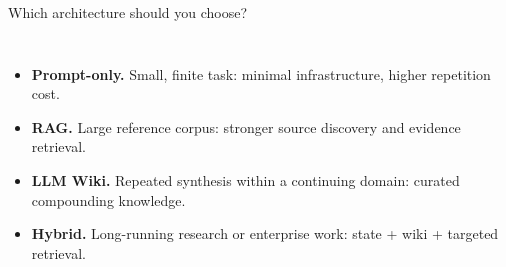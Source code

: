 \begin{frame}{Which architecture should you choose?}
\begin{columns}[c,onlytextwidth]
\begin{itemize}\setlength{\itemsep}{.48em}\small
\item \textbf{Prompt-only.} Small, finite task: minimal infrastructure, higher repetition cost.
\item \textbf{RAG.} Large reference corpus: stronger source discovery and evidence retrieval.
\item \textbf{LLM Wiki.} Repeated synthesis within a continuing domain: curated compounding knowledge.
\item \textbf{Hybrid.} Long-running research or enterprise work: state + wiki + targeted retrieval.
\end{itemize}
\end{columns}
\end{frame}
